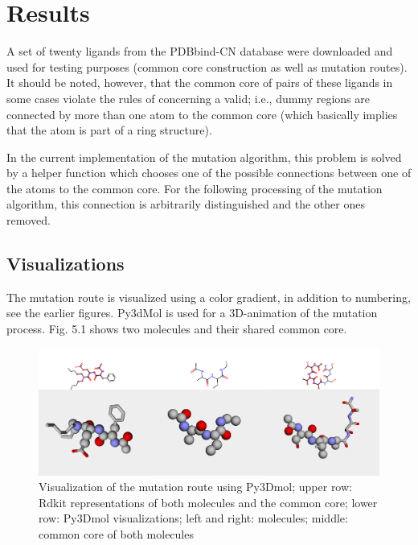 \chapter{Results}

A set of twenty ligands from the PDBbind-CN database were downloaded and used for testing
purposes (common core construction as well as mutation routes). It
should be noted, however, that the common core of pairs of these ligands
in some cases violate the rules of {\trafo} concerning a valid; i.e., dummy regions are connected by more
than one atom to the common core (which basically implies that the
atom is part of a ring structure). 

In the current implementation of the mutation algorithm, this problem
is solved by a helper function which chooses one of the possible connections
between one of the atoms to the common core. For the following processing
of the mutation algorithm, this connection is arbitrarily distinguished
and the other ones removed. 


\section{Visualizations}

The mutation route is visualized using a color gradient, in addition
to numbering, see the earlier figures.
Py3dMol is used for a 3D-animation of the mutation process. Fig. 5.1
shows two molecules and their shared common core.

\begin{figure}
\includegraphics[scale=0.35]{trafo_py3d_1verkleinert}

\caption{Visualization of the mutation route using Py3Dmol; upper row: Rdkit representations
of both molecules and the common core; lower row: Py3Dmol visualizations;
left and right: molecules; middle: common core of both molecules }

\end{figure}


